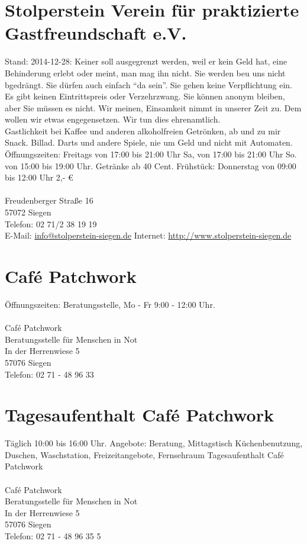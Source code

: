 \section{Stolperstein Verein für praktizierte Gastfreundschaft e.V.}
Stand: 2014-12-28: Keiner soll ausgegrenzt werden, weil er kein Geld hat, eine Behinderung erlebt oder meint, man mag ihn nicht. Sie werden beu uns nicht bgedrängt. Sie dürfen auch einfach \enquote{da sein}. Sie gehen keine Verpflichtung ein. Es gibt keinen Eintrittspreis oder Verzehrzwang. Sie können anonym bleiben, aber Sie müssen es nicht. Wir meinen, Einsamkeit nimmt in unserer Zeit zu. Dem wollen wir etwas engegensetzen. Wir tun dies ehrenamtlich.\\
Gastlichkeit bei Kaffee und anderen alkoholfreien Getrönken, ab und zu mir Snack. Billad. Darts und andere Spiele, nie um Geld und nicht mit Automaten.\\
Öffnungszeiten: Freitags von 17:00 bis 21:00 Uhr Sa, von  17:00 bis 21:00 Uhr So. von 15:00 bis 19:00 Uhr. Getränke ab 40 Cent. Frühstück: Donnerstag von 09:00 bis 12:00 Uhr 2,- \euro \\
\\
Freudenberger Straße 16\\
57072 Siegen\\
Telefon: 02 71/2 38 19 19\\
E-Mail: \href{mailto:info@stolperstein-siegen.de}{info@stolperstein-siegen.de}
Internet: \href{http://www.stolperstein-siegen.de}{http://www.stolperstein-siegen.de} 

\section{Café Patchwork}
Öffnungszeiten:  Beratungsstelle, Mo - Fr 9:00 - 12:00 Uhr.\\
\\
Café Patchwork \\
Beratungsstelle für Menschen in Not\\
In der Herrenwiese 5\\
57076 Siegen\\
Telefon: 02 71 - 48 96 33

\section{Tagesaufenthalt Café Patchwork}
Täglich 10:00 bis 16:00 Uhr. Angebote: Beratung, Mittagstisch Küchenbenutzung, Duschen, Waschstation, Freizeitangebote, Fernsehraum 
Tagesaufenthalt Café Patchwork\\
\\
Café Patchwork \\
Beratungsstelle für Menschen in Not\\
In der Herrenwiese 5\\
57076 Siegen\\
Telefon: 02 71 - 48 96 35 5

